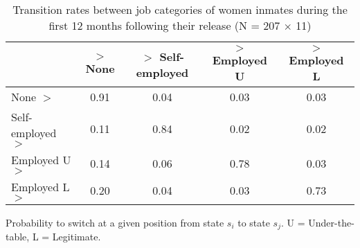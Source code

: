 \begin{table}[htp]
\footnotesize
\setlength{\tabcolsep}{10pt}
\renewcommand{\arraystretch}{1.3}
\begin{threeparttable}
\centering
\caption{Transition rates between job categories of women inmates \newline
    during the first 12 months following their release (N = 207 $\times$ 11)} 
\label{tab:transition_rates_jobs}
\begin{tabular}{lcccc}
  \hline
 & $>$ None & $>$ Self-employed & $>$ Employed U & $>$ Employed L \\ 
  \hline
None $>$ & 0.91 & 0.04 & 0.03 & 0.03 \\ 
  Self-employed $>$ & 0.11 & 0.84 & 0.02 & 0.02 \\ 
  Employed U $>$ & 0.14 & 0.06 & 0.78 & 0.03 \\ 
  Employed L $>$ & 0.20 & 0.04 & 0.03 & 0.73 \\ 
   \hline
\end{tabular}
\begin{tablenotes}
\scriptsize
\item Probability to switch at a given position from state $s_i$ to state $s_j$. U = Under-the-table, L = Legitimate.
\end{tablenotes}
\end{threeparttable}
\end{table}

